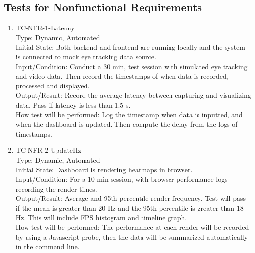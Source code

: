 \documentclass[12pt, titlepage]{article}
\begin{document}
\subsection{Tests for Nonfunctional Requirements}

\begin{enumerate}

\subsubsection{Performance, Reliability, and Scalability Tests}

\item{TC-NFR-1-Latency\\} 
Type: Dynamic, Automated\\ 

Initial State: Both backend and frontend are running locally and the system is connected to mock eye tracking data source.\\

Input/Condition: Conduct a 30 min, test session with simulated eye tracking and video data. Then record the timestamps of when data is recorded, processed and displayed.\\ 

Output/Result: Record the average latency between capturing and visualizing data. Pass if latency is less than 1.5 s.\\ 

How test will be performed: Log the timestamp when data is inputted, and when the dashboard is updated. Then compute the delay from the logs of timestamps.\\ 

\item{TC-NFR-2-UpdateHz\\} 
Type: Dynamic, Automated\\ 

Initial State: Dashboard is rendering heatmaps in browser.\\ 

Input/Condition: For a 10 min session, with browser performance logs recording the render times.\\ 

Output/Result: Average and 95th percentile render frequency. Test will pass if the mean is greater than 20 Hz and the 95th percentile is greater than 18 Hz. This will include FPS histogram and timeline graph.\\ 

How test will be performed: The performance at each render will be recorded by using a Javascript probe, then the data will be summarized automatically in the command line.\\ 


\end{enumerate}
\end{document}
